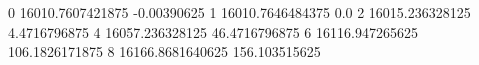 0 16010.7607421875 -0.00390625
1 16010.7646484375 0.0
2 16015.236328125 4.4716796875
4 16057.236328125 46.4716796875
6 16116.947265625 106.1826171875
8 16166.8681640625 156.103515625

